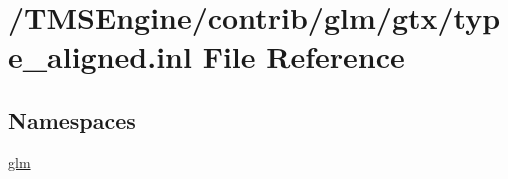 \hypertarget{type__aligned_8inl}{}\section{/\+T\+M\+S\+Engine/contrib/glm/gtx/type\+\_\+aligned.inl File Reference}
\label{type__aligned_8inl}
\subsection*{Namespaces}
\begin{DoxyCompactItemize}
\item 
 \hyperlink{namespaceglm}{glm}
\end{DoxyCompactItemize}
